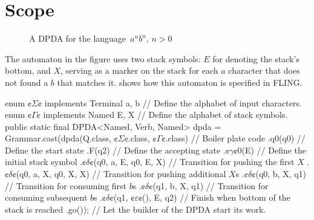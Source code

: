 \documentclass[a4paper,UKenglish,cleveref, autoref]{darts-v2019}
\newenvironment{scope}{\section{Scope}}{}
\begin{document}
\begin{scope}
\begin{enumerate}
\begin{figure}
    \caption{A DPDA for the language~$a^{n}b^{n}$, $n>0$}
    \label{figure:anbn}
    \centering


%
\end{figure}
The automaton in the figure uses two stack symbols: $E$ for denoting the
stack's bottom, and $X$, serving as a marker on the stack for 
each $a$ character that does not found a $b$ that matches it.
 shows how this automaton is specified in FLING.

\begin{excerpt}[language=java,label={lst:anbn},caption={%
    Fling specification, in a fluent API fashion, of the DPDA of \cref{figure:anbn}.}
]
enum ¢$\Sigma$¢ implements Terminal {a, b } // Define the alphabet of input characters. 
enum ¢$\Gamma$¢ implements Named { E, X }// Define the alphabet of stack symbols. 
public static final DPDA<Named, Verb, Named> dpda = 
  Grammar.cast(dpda(Q.class, ¢$\Sigma$¢.class, ¢$\Gamma$¢.class) // Boiler plate code
    .q0(q0) // Define the start state
    .F(q2)  // Define the accepting state
    .¢$\gamma$¢0(E)  //  Define the initial stack symbol
    .¢$\delta$¢(q0, a, E, q0, E, X) // Transition for pushing the first $X$
    .¢$\delta$¢(q0, a, X, q0, X, X) // Transition for pushing additional $X$s
    .¢$\delta$¢(q0, b, X, q1) // Transition for consuming first $b$s
    .¢$\delta$¢(q1, b, X, q1) // Transition for consuming subsequent $b$s
    .¢$\delta$¢(q1, ¢$\varepsilon$¢(), E, q2) // Finish when bottom of the stack is reached
    .go()); // Let the builder of the DPDA start its work. 
\end{excerpt}


\end{enumerate}
\end{scope}
\end{document}
